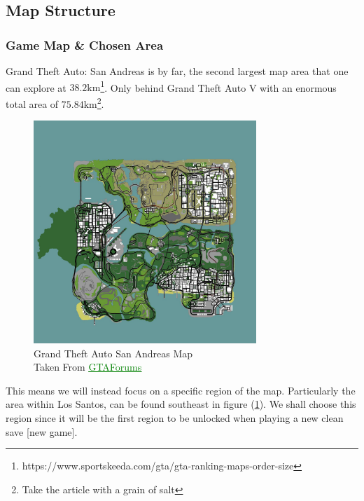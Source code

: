 \documentclass{article}
\begin{document}
	\fi
	
	\subsection*{Map Structure}
	
	\subsubsection*{Game Map \& Chosen Area}
	Grand Theft Auto: San Andreas is by far, the second largest map area that one can explore at \(38.2\unit{\km}\)\footnote{https://www.sportskeeda.com/gta/gta-ranking-maps-order-size}. Only behind Grand Theft Auto V with an enormous total area of \(75.84\unit{\km}\)\footnote{Take the article with a grain of salt}.
	
	\begin{figure}[!h]
		\centering
		\includegraphics[width=0.75\textwidth]{./0img/gtaSAMap.jpg}
		\caption{Grand Theft Auto San Andreas Map \\ Taken From \href{https://gtaforums.com/topic/958639-gta-sa-map-improvements/}{\textcolor{green}{\underline{GTAForums}}}}
		\label{gtasa_map}
	\end{figure} This means we will instead focus on a specific region of the map. Particularly the area within Los Santos, can be found southeast in figure (\ref{gtasa_map}). We shall choose this region since it will be the first region to be unlocked when playing a new clean save [new game].
	
\end{document}
